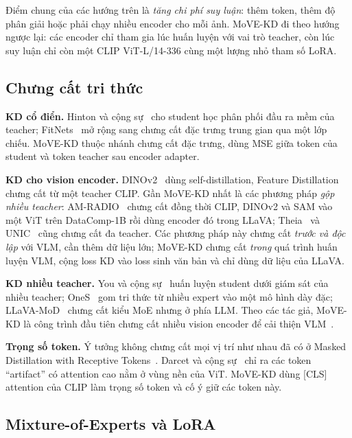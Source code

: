 Điểm chung của các hướng trên là \emph{tăng chi phí suy luận}: thêm token, thêm độ phân giải hoặc phải chạy nhiều encoder cho mỗi ảnh. MoVE-KD đi theo hướng ngược lại: các encoder chỉ tham gia lúc huấn luyện với vai trò teacher, còn lúc suy luận chỉ còn một CLIP ViT-L/14-336 cùng một lượng nhỏ tham số LoRA.

\subsection{Chưng cất tri thức}

\textbf{KD cổ điển.} Hinton và cộng sự~\cite{hinton2015distilling} cho student học phân phối đầu ra mềm của teacher; FitNets~\cite{romero2015fitnets} mở rộng sang chưng cất đặc trưng trung gian qua một lớp chiếu. MoVE-KD thuộc nhánh chưng cất đặc trưng, dùng MSE giữa token của student và token teacher sau encoder adapter.

\textbf{KD cho vision encoder.} DINOv2~\cite{oquab2024dinov2} dùng self-distillation, Feature Distillation~\cite{wei2022fd} chưng cất từ một teacher CLIP. Gần MoVE-KD nhất là các phương pháp \emph{gộp nhiều teacher}: AM-RADIO~\cite{ranzinger2024radio} chưng cất đồng thời CLIP, DINOv2 và SAM vào một ViT trên DataComp-1B rồi dùng encoder đó trong LLaVA; Theia~\cite{shang2024theia} và UNIC~\cite{sariyildiz2024unic} cũng chưng cất đa teacher. Các phương pháp này chưng cất \emph{trước và độc lập} với VLM, cần thêm dữ liệu lớn; MoVE-KD chưng cất \emph{trong} quá trình huấn luyện VLM, cộng loss KD vào loss sinh văn bản và chỉ dùng dữ liệu của LLaVA.

\textbf{KD nhiều teacher.} You và cộng sự~\cite{you2017multiple} huấn luyện student dưới giám sát của nhiều teacher; OneS~\cite{xue2022ones} gom tri thức từ nhiều expert vào một mô hình dày đặc; LLaVA-MoD~\cite{shu2024llavamod} chưng cất kiểu MoE nhưng ở phía LLM. Theo các tác giả, MoVE-KD là công trình đầu tiên chưng cất nhiều vision encoder để cải thiện VLM~\cite{cao2025movekd}.

\textbf{Trọng số token.} Ý tưởng không chưng cất mọi vị trí như nhau đã có ở Masked Distillation with Receptive Tokens~\cite{huang2023mdrt}. Darcet và cộng sự~\cite{darcet2024registers} chỉ ra các token ``artifact'' có attention cao nằm ở vùng nền của ViT. MoVE-KD dùng [CLS] attention của CLIP làm trọng số token và cố ý giữ các token này.

\subsection{Mixture-of-Experts và LoRA}

